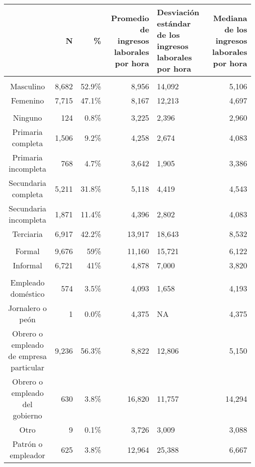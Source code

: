 \begin{table}[t]
\fontsize{12.0pt}{14.4pt}\selectfont
\begin{tabular*}{\linewidth}{@{\extracolsep{\fill}}crrrlr}
\toprule
  & N & \% & Promedio de ingresos laborales por hora & Desviación estándar de los ingresos laborales por hora & Mediana de los ingresos laborales por hora \\ 
\midrule\addlinespace[2.5pt]
\multicolumn{6}{l}{{\bfseries Sexo}} \\[2.5pt] 
\midrule\addlinespace[2.5pt]
Masculino & 8,682 & 52.9\% & 8,956 & 14,092 & 5,106 \\ 
Femenino & 7,715 & 47.1\% & 8,167 & 12,213 & 4,697 \\ 
\midrule\addlinespace[2.5pt]
\multicolumn{6}{l}{{\bfseries Máximo nivel educativo}} \\[2.5pt] 
\midrule\addlinespace[2.5pt]
Ninguno &   124 &  0.8\% &  3,225 &  2,396 & 2,960 \\ 
Primaria completa & 1,506 &  9.2\% &  4,258 &  2,674 & 4,083 \\ 
Primaria incompleta &   768 &  4.7\% &  3,642 &  1,905 & 3,386 \\ 
Secundaria completa & 5,211 & 31.8\% &  5,118 &  4,419 & 4,543 \\ 
Secundaria incompleta & 1,871 & 11.4\% &  4,396 &  2,802 & 4,083 \\ 
Terciaria & 6,917 & 42.2\% & 13,917 & 18,643 & 8,532 \\ 
\midrule\addlinespace[2.5pt]
\multicolumn{6}{l}{{\bfseries Formalidad}} \\[2.5pt] 
\midrule\addlinespace[2.5pt]
Formal & 9,676 & 59\% & 11,160 & 15,721 & 6,122 \\ 
Informal & 6,721 & 41\% &  4,878 &  7,000 & 3,820 \\ 
\midrule\addlinespace[2.5pt]
\multicolumn{6}{l}{{\bfseries Posición ocupacional}} \\[2.5pt] 
\midrule\addlinespace[2.5pt]
Empleado doméstico &   574 &  3.5\% &  4,093 &  1,658 &  4,193 \\ 
Jornalero o peón &     1 &  0.0\% &  4,375 &     NA &  4,375 \\ 
Obrero o empleado de empresa particular & 9,236 & 56.3\% &  8,822 & 12,806 &  5,150 \\ 
Obrero o empleado del gobierno &   630 &  3.8\% & 16,820 & 11,757 & 14,294 \\ 
Otro &     9 &  0.1\% &  3,726 &  3,009 &  3,088 \\ 
Patrón o empleador &   625 &  3.8\% & 12,964 & 25,388 &  6,667 \\ 

\end{tabular*}
\end{table}
